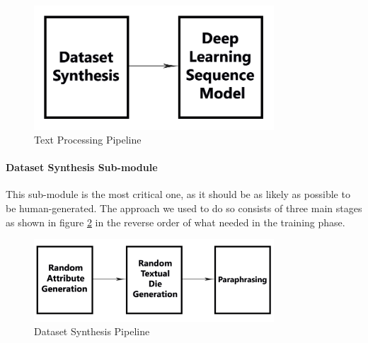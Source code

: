 \begin{figure}[H]
        \centering
        \includegraphics[width=0.8\textwidth]{images/text-processing-submodule.png}
        \caption{Text Processing Pipeline}
        \label{fig:text_processing_pipeline}
    \end{figure}

\paragraph{Dataset Synthesis Sub-module}
This sub-module is the most critical one, as it should be as likely as possible to be human-generated. The approach we used to do so consists of three main stages as shown in figure \ref{fig:dataset_syn} in the reverse order of what needed in the training phase.

\begin{figure}[H]
        \centering
        \includegraphics[width=0.8\textwidth]{images/data-synthesis.png}
        \caption{Dataset Synthesis Pipeline}
        \label{fig:dataset_syn}
    \end{figure}


